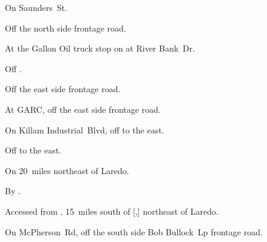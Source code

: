 
\begin{LocationList}

On  Saunders~St.

Off the north side  frontage road.

At the Gallon Oil truck stop on  at River Bank~Dr.

\Location{\GarageHQ \Garage}
Off .

Off the east side  frontage road.

At GARC, off the east side  frontage road.

On Killam Industrial~Blvd, off  to the east.

Off  to the east.

On  20~miles northeast of Laredo.

\Location{\RecruitmentAgency \Recruitment}
By .

Accessed from , 15~miles south of [,] northeast of Laredo.

On McPherson~Rd, off the south side   Bob Bullock~Lp frontage road.

\end{LocationList}
